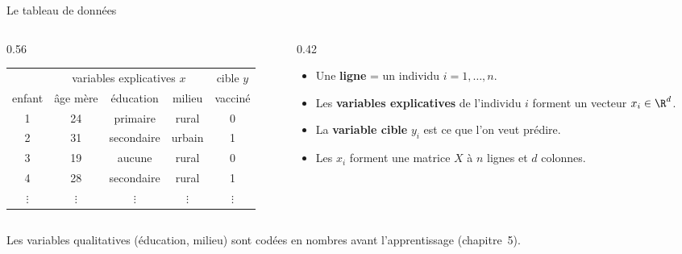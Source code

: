 \documentclass[aspectratio=169,11pt]{beamer}
\begin{document}
\begin{frame}{Le tableau de données}
  \begin{columns}[T]
    \begin{column}{0.56\textwidth}
      \small
      \renewcommand{\arraystretch}{1.2}
      \begin{tabular}{c|ccc|c}
        & \multicolumn{3}{c|}{variables explicatives $x$} & cible $y$ \\
        enfant & âge mère & éducation & milieu & vacciné \\ \hline
        1 & 24 & primaire & rural & 0 \\
        2 & 31 & secondaire & urbain & 1 \\
        3 & 19 & aucune & rural & 0 \\
        4 & 28 & secondaire & rural & 1 \\
        $\vdots$ & $\vdots$ & $\vdots$ & $\vdots$ & $\vdots$
      \end{tabular}
    \end{column}
    \begin{column}{0.42\textwidth}
      \small
      \begin{itemize}
        \item Une \textbf{ligne} = un individu $i=1,\dots,n$.
        \item Les \textbf{variables explicatives} de l'individu $i$ forment un vecteur $x_i\in\R^d$.
        \item La \textbf{variable cible} $y_i$ est ce que l'on veut prédire.
        \item Les $x_i$ forment une matrice $X$ à $n$ lignes et $d$ colonnes.
      \end{itemize}
    \end{column}
  \end{columns}
  \vskip3mm
  {\small\color{cnfGris}Les variables qualitatives (éducation, milieu) sont codées en nombres avant l'apprentissage (chapitre~5).}
\end{frame}
\end{document}
